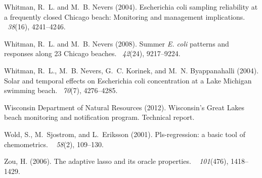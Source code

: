 \documentclass[authoryear,review, 12pt]{elsarticle}
\begin{document}
\begin{thebibliography}{}
Whitman, R.~L. and M.~B. Nevers (2004).
\newblock Escherichia coli sampling reliability at a frequently closed {C}hicago
  beach: Monitoring and management implications.
~{\em 38\/}(16),
  4241--4246.

Whitman, R.~L. and M.~B. Nevers (2008).
\newblock Summer \emph{{E}. coli} patterns and responses along 23 {C}hicago beaches.
~{\em 42\/}(24),
  9217--9224.

Whitman, R.~L., M.~B. Nevers, G.~C. Korinek, and M.~N. Byappanahalli (2004).
\newblock Solar and temporal effects on {E}scherichia coli concentration at a
  {Lake Michigan} swimming beach.
~{\em 70\/}(7),
  4276--4285.

{Wisconsin Department of Natural Resources} (2012).
\newblock Wisconsin's {G}reat {L}akes beach monitoring and notification
  program.
\newblock Technical report.

Wold, S., M.~Sjostrom, and L.~Eriksson (2001).
\newblock Pls-regression: a basic tool of chemometrics.
~{\em
  58\/}(2), 109--130.

Zou, H. (2006).
\newblock The adaptive lasso and its oracle properties.
~{\em
  101\/}(476), 1418--1429.

\end{thebibliography}
\end{document}
